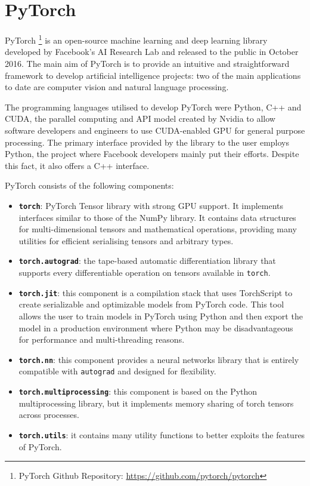 \section{PyTorch}

PyTorch \footnote{PyTorch Github Repository: \href{https://github.com/pytorch/pytorch}{https://github.com/pytorch/pytorch}} \cite{paszke2017automatic}  is an open-source machine learning and deep learning library developed by Facebook's AI Research Lab and released to the public in October 2016. The main aim of PyTorch is to provide an intuitive and straightforward framework to develop artificial intelligence projects: two of the main applications to date are computer vision and natural language processing.

The programming languages utilised to develop PyTorch were Python, C++ and CUDA, the parallel computing and API model created by Nvidia to allow software developers and engineers to use CUDA-enabled GPU for general purpose processing. The primary interface provided by the library to the user employs Python, the project where Facebook developers mainly put their efforts. Despite this fact, it also offers a C++ interface. 

PyTorch consists of the following components:
\begin{itemize}
\item \textbf{\texttt{torch}}: PyTorch Tensor library with strong GPU support. It implements interfaces similar to those of the NumPy library. It contains data structures for multi-dimensional tensors and mathematical operations, providing many utilities for efficient serialising tensors and arbitrary types.
\item \textbf{\texttt{torch.autograd}}: the tape-based automatic differentiation library that supports every differentiable operation on tensors available in \texttt{torch}. 
\item \textbf{\texttt{torch.jit}}: this component is a compilation stack that uses TorchScript to create serializable and optimizable models from PyTorch code. This tool allows the user to train models in PyTorch using Python and then export the model in a production environment where Python may be disadvantageous for performance and multi-threading reasons.
\item \textbf{\texttt{torch.nn}}: this component provides a neural networks library that is entirely compatible with \texttt{autograd} and designed for flexibility.
\item \textbf{\texttt{torch.multiprocessing}}: this component is based on the Python multiprocessing library, but it implements memory sharing of torch tensors across processes.
\item \textbf{\texttt{torch.utils}}: it contains many utility functions to better exploits the features of PyTorch.
\end{itemize}

